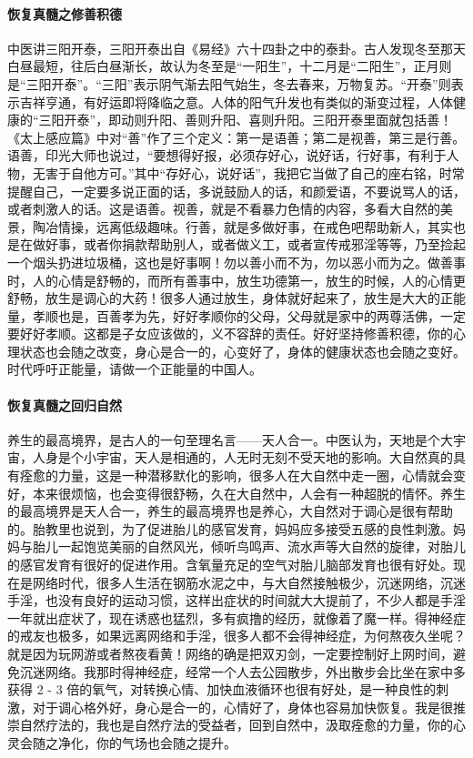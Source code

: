 \paragraph{恢复真髓之修善积德}

中医讲三阳开泰，三阳开泰出自《易经》六十四卦之中的泰卦。古人发现冬至那天白昼最短，往后白昼渐长，故认为冬至是“一阳生”，十二月是“二阳生”，正月则是“三阳开泰”。“三阳”表示阴气渐去阳气始生，冬去春来，万物复苏。“开泰”则表示吉祥亨通，有好运即将降临之意。人体的阳气升发也有类似的渐变过程，人体健康的“三阳开泰”，即动则升阳、善则升阳、喜则升阳。三阳开泰里面就包括善！《太上感应篇》中对“善”作了三个定义：第一是语善；第二是视善，第三是行善。语善，印光大师也说过，“要想得好报，必须存好心，说好话，行好事，有利于人物，无害于自他方可。”其中“存好心，说好话”，我把它当做了自己的座右铭，时常提醒自己，一定要多说正面的话，多说鼓励人的话，和颜爱语，不要说骂人的话，或者刺激人的话。这是语善。视善，就是不看暴力色情的内容，多看大自然的美景，陶冶情操，远离低级趣味。行善，就是多做好事，在戒色吧帮助新人，其实也是在做好事，或者你捐款帮助别人，或者做义工，或者宣传戒邪淫等等，乃至捡起一个烟头扔进垃圾桶，这也是好事啊！勿以善小而不为，勿以恶小而为之。做善事时，人的心情是舒畅的，而所有善事中，放生功德第一，放生的时候，人的心情更舒畅，放生是调心的大药！很多人通过放生，身体就好起来了，放生是大大的正能量，孝顺也是，百善孝为先，好好孝顺你的父母，父母就是家中的两尊活佛，一定要好好孝顺。这都是子女应该做的，义不容辞的责任。好好坚持修善积德，你的心理状态也会随之改变，身心是合一的，心变好了，身体的健康状态也会随之变好。时代呼吁正能量，请做一个正能量的中国人。

\paragraph{恢复真髓之回归自然}

养生的最高境界，是古人的一句至理名言——天人合一。中医认为，天地是个大宇宙，人身是个小宇宙，天人是相通的，人无时无刻不受天地的影响。大自然真的具有痊愈的力量，这是一种潜移默化的影响，很多人在大自然中走一圈，心情就会变好，本来很烦恼，也会变得很舒畅，久在大自然中，人会有一种超脱的情怀。养生的最高境界是天人合一，养生的最高境界也是养心，大自然对于调心是很有帮助的。胎教里也说到，为了促进胎儿的感官发育，妈妈应多接受五感的良性刺激。妈妈与胎儿一起饱览美丽的自然风光，倾听鸟鸣声、流水声等大自然的旋律，对胎儿的感官发育有很好的促进作用。含氧量充足的空气对胎儿脑部发育也很有好处。现在是网络时代，很多人生活在钢筋水泥之中，与大自然接触极少，沉迷网络，沉迷手淫，也没有良好的运动习惯，这样出症状的时间就大大提前了，不少人都是手淫一年就出症状了，现在诱惑也猛烈，多有疯撸的经历，就像着了魔一样。得神经症的戒友也极多，如果远离网络和手淫，很多人都不会得神经症，为何熬夜久坐呢？就是因为玩网游或者熬夜看黄！网络的确是把双刃剑，一定要控制好上网时间，避免沉迷网络。我那时得神经症，经常一个人去公园散步，外出散步会比坐在家中多获得 2 - 3 倍的氧气，对转换心情、加快血液循环也很有好处，是一种良性的刺激，对于调心格外好，身心是合一的，心情好了，身体也容易加快恢复。我是很推崇自然疗法的，我也是自然疗法的受益者，回到自然中，汲取痊愈的力量，你的心灵会随之净化，你的气场也会随之提升。


